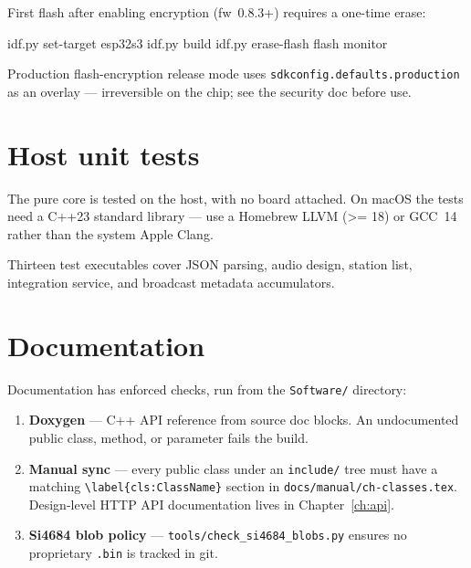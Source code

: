 First flash after enabling encryption (fw~0.8.3+) requires a one-time erase:

\begin{drcode}
idf.py set-target esp32s3
idf.py build
idf.py erase-flash flash monitor
\end{drcode}

Production flash-encryption release mode uses \texttt{sdkconfig.defaults.production}
as an overlay --- irreversible on the chip; see the security doc before use.

\section{Host unit tests}

The pure core is tested on the host, with no board attached. On macOS the
tests need a C++23 standard library --- use a Homebrew LLVM (>= 18) or
GCC~14 rather than the system Apple Clang.


Thirteen test executables cover JSON parsing, audio design, station list,
integration service, and broadcast metadata accumulators.

\section{Documentation}

Documentation has enforced checks, run from the \texttt{Software/}
directory:

\begin{enumerate}
  \item \textbf{Doxygen} --- C++ API reference from source doc blocks.
        An undocumented public class, method, or parameter fails the build.
  \item \textbf{Manual sync} --- every public class under an
        \texttt{include/} tree must have a matching
        \texttt{\textbackslash label\{cls:ClassName\}} section in
        \texttt{docs/manual/ch-classes.tex}. Design-level HTTP API
        documentation lives in Chapter~\ref{ch:api}.
  \item \textbf{Si4684 blob policy} --- \texttt{tools/check\_si4684\_blobs.py}
        ensures no proprietary \texttt{.bin} is tracked in git.
\end{enumerate}

